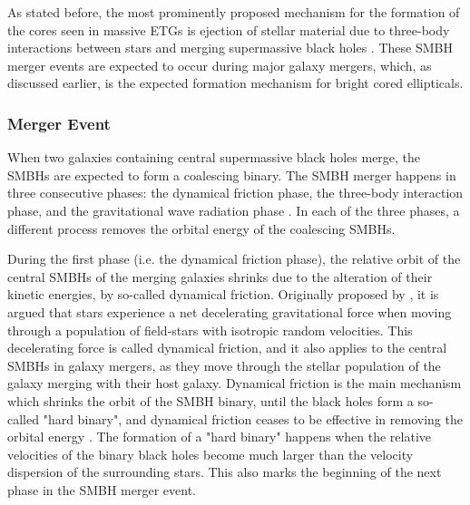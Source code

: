 \documentclass[english, oneside]{HYgradu}
\begin{document}
As stated before, the most prominently proposed mechanism for the formation of the cores seen in massive ETGs is ejection of stellar material due to three-body interactions between stars and merging supermassive black holes \citep[e.g.][]{Faber1997, Milosavljevic2002, GalaxyFormationAndEvo2010}. These SMBH merger events are expected to occur during major galaxy mergers, which, as discussed earlier, is the expected formation mechanism for bright cored ellipticals.

\subsubsection{Merger Event}

When two galaxies containing central supermassive black holes merge, the SMBHs are expected to form a coalescing binary. The SMBH merger happens in three consecutive phases: the dynamical friction phase, the three-body interaction phase, and the gravitational wave radiation phase \citep{MerrittBook}. In each of the three phases, a different process removes the orbital energy of the coalescing SMBHs.

During the first phase (i.e. the dynamical friction phase), the relative orbit of the central SMBHs of the merging galaxies shrinks due to the alteration of their kinetic energies, by so-called dynamical friction. Originally proposed by \cite{Chandrasekhar1943}, it is argued that stars experience a net decelerating gravitational force when moving through a population of field-stars with isotropic random velocities. This decelerating force is called dynamical friction, and it also applies to the central SMBHs in galaxy mergers, as they move through the stellar population of the galaxy merging with their host galaxy. Dynamical friction is the main mechanism which shrinks the orbit of the SMBH binary, until the black holes form a so-called "hard binary", and dynamical friction ceases to be effective in removing the orbital energy \citep{BinneyTremaine}. The formation of a "hard binary" happens when the relative velocities of the binary black holes become much larger than the velocity dispersion of the surrounding stars. This also marks the beginning of the next phase in the SMBH merger event.

\end{document}
